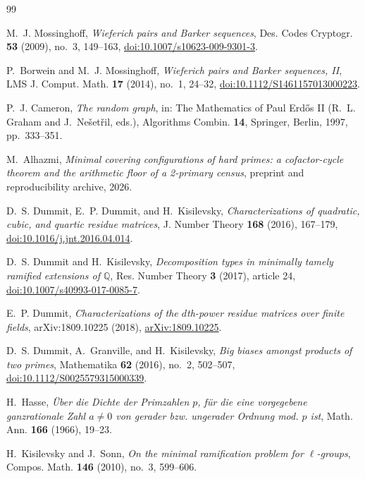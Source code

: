 \documentclass[11pt]{article}
\theoremstyle{definition}
\theoremstyle{remark}
\newcommand{\Q}{\mathbb Q}
\begin{document}
\begin{thebibliography}{99}

M.~J. Mossinghoff,
\emph{Wieferich pairs and Barker sequences},
Des. Codes Cryptogr. \textbf{53} (2009), no.~3, 149--163,
\href{https://doi.org/10.1007/s10623-009-9301-3}{doi:10.1007/s10623-009-9301-3}.

P.~Borwein and M.~J. Mossinghoff,
\emph{Wieferich pairs and Barker sequences, II},
LMS J. Comput. Math. \textbf{17} (2014), no.~1, 24--32,
\href{https://doi.org/10.1112/S1461157013000223}{doi:10.1112/S1461157013000223}.

P.~J. Cameron,
\emph{The random graph},
in: The Mathematics of Paul Erd\H{o}s II
(R.~L. Graham and J.~Ne\v{s}et\v{r}il, eds.),
Algorithms Combin. \textbf{14}, Springer, Berlin, 1997, pp.~333--351.

M.~Alhazmi,
\emph{Minimal covering configurations of hard primes: a cofactor-cycle
theorem and the arithmetic floor of a 2-primary census}, preprint and
reproducibility archive, 2026.

D.~S. Dummit, E.~P. Dummit, and H.~Kisilevsky,
\emph{Characterizations of quadratic, cubic, and quartic residue matrices},
J. Number Theory \textbf{168} (2016), 167--179,
\href{https://doi.org/10.1016/j.jnt.2016.04.014}{doi:10.1016/j.jnt.2016.04.014}.

D.~S. Dummit and H.~Kisilevsky,
\emph{Decomposition types in minimally tamely ramified extensions of
$\Q$}, Res. Number Theory \textbf{3} (2017), article 24,
\href{https://doi.org/10.1007/s40993-017-0085-7}{doi:10.1007/s40993-017-0085-7}.

E.~P. Dummit,
\emph{Characterizations of the $d$th-power residue matrices over finite
fields}, arXiv:1809.10225 (2018),
\href{https://arxiv.org/abs/1809.10225}{arXiv:1809.10225}.

D.~S. Dummit, A.~Granville, and H.~Kisilevsky,
\emph{Big biases amongst products of two primes},
Mathematika \textbf{62} (2016), no.~2, 502--507,
\href{https://doi.org/10.1112/S0025579315000339}{doi:10.1112/S0025579315000339}.

H.~Hasse,
\emph{\"Uber die Dichte der Primzahlen $p$, f\"ur die eine vorgegebene
ganzrationale Zahl $a\ne0$ von gerader bzw. ungerader Ordnung mod. $p$ ist},
Math. Ann. \textbf{166} (1966), 19--23.

H.~Kisilevsky and J.~Sonn,
\emph{On the minimal ramification problem for $\ell$-groups},
Compos. Math. \textbf{146} (2010), no.~3, 599--606.


\end{thebibliography}
\end{document}
